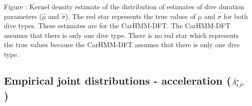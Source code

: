 \documentclass{article}
\begin{document}
        \noindent Figure : Kernel density estimate of the distribution of estimates of dive duration parameters ($\hat \mu$ and $\hat \sigma$). The red star represents the true values of $\mu$ and $\sigma$ for both dive types. These estimates are for the CarHMM-DFT. The CarHMM-DFT assumes that there is only one dive type. There is no red star which represents the true values because the CarHMM-DFT assumes that there is only one dive type.
        \addtocounter{fignum}{1}
    
    \newpage
    \subsection{Empirical joint distributions - acceleration ($\tilde{A}^*_{t,\tilde t^*}$)}

        \begin{center}
\end{center}
\end{document}
